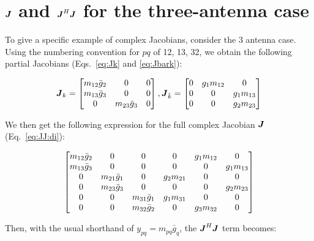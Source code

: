 \documentclass[useAMS,usenatbib]{mn2e}
\makeatletter
\newcommand{\mat}[1]{{\bmath{#1}}}
\newcommand{\JJ}{\mat{J}} %
\newcommand{\Matrix}[2]{\left [ \begin{array}{@{}#1@{}}#2\end{array} \right ]}
\makeatother
\begin{document}



\appendix

\section{$\JJ$ and $\JJ^H\JJ$ for the three-antenna case}
\label{sec:3ant}

To give a specific example of complex Jacobians, consider the 3 antenna case.
Using the numbering convention for $pq$ of 12, 13, 32, we obtain the following partial Jacobians
(Eqs.~\ref{eq:Jk} and \ref{eq:Jbark}):

\[
\JJ_k = \Matrix{ccc}{m_{12}\bar{g}_2 & 0 & 0 \\ m_{13}\bar{g}_3 & 0 & 0 \\ 0 & m_{23}\bar{g}_3 & 0 },
\JJ_{\bar{k}} = \Matrix{ccc}{0 & g_1 m_{12} & 0 \\ 0 & 0 & g_1 m_{13} \\ 0 & 0 & g_2 m_{23} }
\]

We then get the following expression
for the full complex Jacobian $\JJ$ (Eq.~\ref{eq:JJ:di}):

\begin{equation}
\label{eq:JJ:3ant}
\Matrix{cccccc}{
  m_{12}\bar{g}_2 & 0               & 0 &  0          & g_1 m_{12} & 0           \\
  m_{13}\bar{g}_3 & 0               & 0 &  0          & 0          & g_1 m_{13}  \\
  0               & m_{21}\bar{g}_1 & 0 &  g_2 m_{21} & 0          & 0  \\
  0               & m_{23}\bar{g}_3 & 0 &  0          & 0          & g_2 m_{23} \\
  0               & 0               & m_{31}\bar{g}_1 & g_1 m_{31} & 0          & 0  \\
  0               & 0               & m_{32}\bar{g}_2 & 0 & g_3 m_{32} & 0 \\
}
\end{equation}



Then, with the usual shorthand of $y_{pq} = m_{pq} \bar{g}_q$, the
$\JJ^H\JJ$ term becomes:
\end{document}
